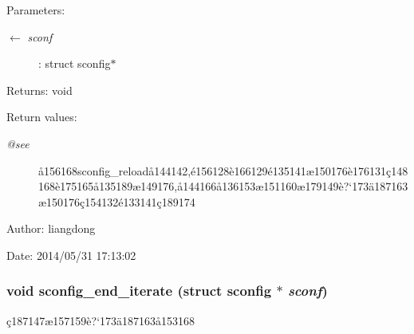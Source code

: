 \begin{Desc}
\item[Parameters:]
\begin{description}
\item[\mbox{$\leftarrow$} {\em sconf}]: struct sconfig$\ast$ \end{description}
\end{Desc}
\begin{Desc}
\item[Returns:]void \end{Desc}
\begin{Desc}
\item[Return values:]
\begin{description}
\item[{\em @see}]\aa{}156168sconfig\_\-reload\aa{}144142,\'{e}156128\`{e}166129\'{e}135141\ae{}150176\`{e}176131\c{c}148168\`{e}175165\aa{}135189\ae{}149176,\aa{}144166\aa{}136153\ae{}151160\ae{}179149\`{e}?`173\"{a}187163\ae{}150176\c{c}154132\'{e}133141\c{c}189174 \end{description}
\end{Desc}
\begin{Desc}
\item[Author:]liangdong \end{Desc}
\begin{Desc}
\item[Date:]2014/05/31 17:13:02 \end{Desc}
\subsubsection{\setlength{\rightskip}{0pt plus 5cm}void sconfig\_\-end\_\-iterate (struct sconfig $\ast$ {\em sconf})}\label{sconfig_8h_a11}


\c{c}187147\ae{}157159\`{e}?`173\"{a}187163\aa{}153168 

